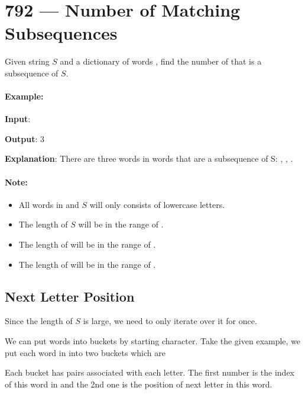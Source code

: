 \section{792 --- Number of Matching Subsequences}
Given string $S$ and a dictionary of words , find the number of  that is a subsequence of $S$.

\paragraph{Example:}

\begin{flushleft}
\textbf{Input}: 



\textbf{Output}: 3

\textbf{Explanation}: There are three words in words that are a subsequence of S: , , .
\end{flushleft}

\paragraph{Note:}

\begin{itemize}
\item All words in  and $S$ will only consists of lowercase letters.
\item The length of $S$ will be in the range of \fcj{[1, 50000]}.
\item The length of  will be in the range of \fcj{[1, 5000]}.
\item The length of  will be in the range of \fcj{[1, 50]}.
\end{itemize}

\subsection{Next Letter Position}
Since the length of $S$ is large, we need to only iterate over it for once.

We can put words into buckets by starting character. Take the given example, we put each word in  into two buckets which are



Each bucket has pairs associated with each letter. The first number is the index of this word in  and the 2nd one is the position of next letter in this word.

